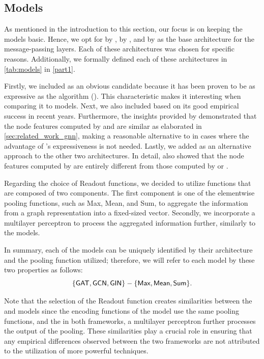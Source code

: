\subsection{\gnn Models}\label{sec:gnn_model_choice}
As mentioned in the introduction to this section, our focus is on keeping the models basic. Hence, we opt for \gin by \cite{Xu2018}, \gcn by \cite{Kip+2017}, and \gat by \cite{Velivckovic2017} as the base architecture for the message-passing layers. Each of these architectures was chosen for specific reasons. Additionally, we formally defined each of these architectures in \cref{tab:models} in \cref{part1}.

Firstly, we included \gin as an obvious candidate because it has been proven to be as expressive as the \wl algorithm (\cite{Xu2018,Morris2018}). This characteristic makes it interesting when comparing it to \wlnn models.
Next, we also included \gcn based on its good empirical success in recent years. Furthermore, the insights provided by \cite{Nikolentzos2023} demonstrated that the node features computed by \gcn and \gin are similar as elaborated in \cref{sec:related_work_gnn}, making \gcn a reasonable alternative to \gin in cases where the advantage of \gin's expressiveness is not needed.
Lastly, we added \gat as an alternative approach to the other two architectures. In detail, \cite{Nikolentzos2023} also showed that the node features computed by \gat are entirely different from those computed by \gin or \gcn.

Regarding the choice of \textsf{Readout} functions, we decided to utilize functions that are composed of two components. The first component is one of the elementwise pooling functions, such as \textsf{Max}, \textsf{Mean}, and \textsf{Sum}, to aggregate the information from a graph representation into a fixed-sized vector. Secondly, we incorporate a multilayer perceptron to process the aggregated information further, similarly to the \wlnn models.

In summary, each of the \gnn models can be uniquely identified by their \gnn architecture and the pooling function utilized; therefore, we will refer to each model by these two properties as follows:
\begin{equation*}
	{\{\gat, \gcn, \gin\}} - \{\textsf{Max}, \textsf{Mean}, \textsf{Sum}\}.
\end{equation*}


Note that the selection of the \textsf{Readout} function creates similarities between the \gnn and \wlnn models since the encoding functions of the \wlnn model use the same pooling functions, and the in both frameworks, a multilayer perceptron further processes the output of the pooling. These similarities play a crucial role in ensuring that any empirical differences observed between the two frameworks are not attributed to the utilization of more powerful techniques.

